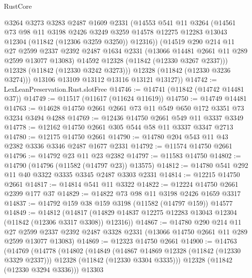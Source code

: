 \begin{lexlean}{RustCore}
\begin{coremodule}
            @3264
            @3273
            @3283
            @2487
            @1609
            @2331
            (@14553
              @541
              @11
              @3264
              (@14561
                @73
                @98
                @11
                @3198
                @2426
                @3249
                @3259
                @14578
                @12275
                @12283
                @13043
                @12304
                (@11842 (@12306 @3259 @3250))
                @12316))
            (@14519
              @290
              @214
              @11
              @27
              @2599
              @2337
              @2392
              @2487
              @1634
              @2331
              (@13066 @14481 @2661 @11 @289 @2599 @13077 @13083)
              @14592
              @12328
              (@11842 (@12330 @3267 @2337)))
            @12328
            (@11842 (@12330 @3242 @3273)))
          @12328
          (@11842 (@12330 @3236 @3274)))
        @13106
        @13109
        @13112
        @13116
        @13121
        @13127))
@14742 := LexLeanPreservation.Rust.slotFree
@14746 := @14741 (@11842 (@14742 @14481 @37))
@14749 := @11517 (@11617 (@11624 @11619))
@14750 := @14749 @14481
@14763 := @14628 @14750 @2661 @2661 @73 @11 @549 @650 @172 @3351 @73 @3234 @3494 @4288
@14769 := @12436 @14750 @2661 @549 @11 @3337 @3349
@14778 := @12162 @14750 @2661 @305 @544 @58 @11 @3337 @3347 @2713
@14780 := @12175 @14750 @2661
@14790 := @14780 @204 @543 @11 @43 @2382 @3336 @3346 @2487 @1677 @2331
@14792 := @11574 @14750 @2661
@14796 := @14792 @23 @11 @23 @2382
@14797 := @11583 @14750
@14802 := @14790 (@14796 (@11582 (@14797 @23)) @13575)
@14812 := @14780 @541 @292 @11 @40 @3322 @3335 @3345 @2487 @3303 @2331
@14814 := @12215 @14750 @2661
@14817 := @14814 @541 @11 @3322
@14822 := @12224 @14750 @2661 @2399 @177 @37
@14829 := @14822 @73 @98 @11 @3198 @2426 @1659 @3317
@14837 := @14792 @159 @38 @159 @3198 (@11582 (@14797 @159)) @14577
@14849 := @14812
    (@14817 (@14829 @14837 @12275 @12283 @13043 @12304 (@11842 (@12306 @3317 @3308)) @12316))
@14867 := @14780
    @290
    @214
    @11
    @27
    @2599
    @2337
    @2392
    @2487
    @3328
    @2331
    (@13066 @14750 @2661 @11 @289 @2599 @13077 @13083)
@14869 := @12323 @14750 @2661
@14900 := @14763
    (@14769
      (@14778
        (@14802
          (@14849
            (@14867 @14869 @12328 (@11842 (@12330 @3329 @2337)))
            @12328
            (@11842 (@12330 @3304 @3335)))
          @12328
          (@11842 (@12330 @3294 @3336)))
        @13303

\end{coremodule}
\end{lexlean}
